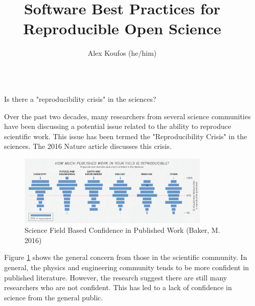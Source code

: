 \documentclass[final]{beamer}
\title{Software Best Practices for Reproducible Open Science}
\author{Alex Koufos (he/him)\inst{1}} %
\institute[shortinst]{\inst{1} Stanford University}
\newlength{\sepwidth}
\newlength{\colwidth}
\newcommand{\separatorcolumn}{\begin{column}{\sepwidth}\end{column}}
\begin{document}
\begin{frame}[t]
\begin{columns}[t]
\separatorcolumn

\begin{column}{\colwidth}

  \begin{block}{Is there a "reproducibility crisis" in the sciences?}

    Over the past two decades, many researchers from several science communities
    have been discussing a potential issue related to the ability to reproduce
    scientific work.
    This issue has been termed the "Reproducibility Crisis" in the sciences.
    The 2016 Nature article\cite{baker2016} discusses this crisis.
       
    \begin{figure}
      \centering
      \includegraphics[width=0.85\textwidth]{tess2024/Nature-Field-Confidence.png}
      \caption{Science Field Based Confidence in Published Work (Baker, M. 2016)\cite{baker2016}}
      \label{fig:confidence}
    \end{figure}

    Figure \ref*{fig:confidence} shows the general concern from those in the
    scientific community.
    In general, the physics and engineering community tends to be more
    confident in published literature.
    However, the research suggest there are still many researchers who are not
    confident.
    This has led to a lack of confidence in science from the general public.


\end{block}
\end{column}
\end{columns}
\end{frame}
\end{document}
